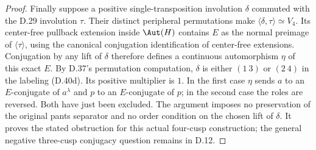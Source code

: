 \begin{proof}
Finally suppose a positive single-transposition
involution $\delta$ commuted with the D.29 involution
$\tau$. Their distinct peripheral permutations make
$\langle\delta,\tau\rangle\simeq V_4$.
Its center-free pullback extension inside $\Aut(H)$
contains $E$ as the normal preimage of $\langle\tau\rangle$,
using the canonical conjugation identification of
center-free extensions. Conjugation by any lift of
$\delta$ therefore defines a continuous automorphism
$\eta$ of this exact $E$.
By D.37's permutation computation, $\delta$ is either
$(1\ 3)$ or $(2\ 4)$ in the labeling (D.40d).
Its positive multiplier is $1$.
In the first case $\eta$ sends $a$ to an $E$-conjugate
of $a^\lambda$ and $p$ to an $E$-conjugate of $p$;
in the second case the roles are reversed.
Both have just been excluded. The argument imposes
no preservation of the original pants separator and
no order condition on the chosen lift of $\delta$.
It proves the stated obstruction for this actual
four-cusp construction; the general negative
three-cusp conjugacy question remains in D.12.
\end{proof}
